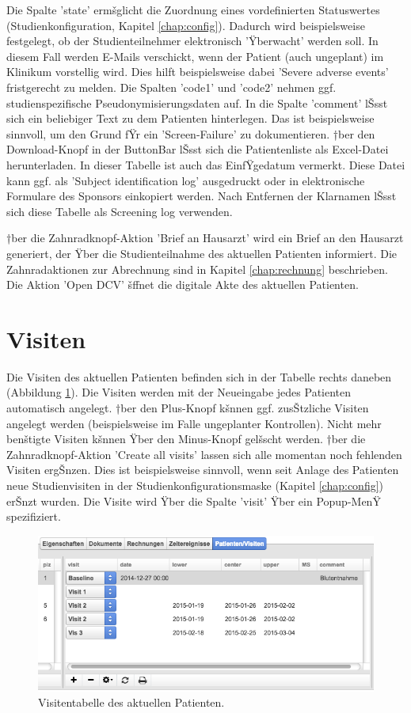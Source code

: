 \documentclass[11pt,oneside]{scrbook}
\begin{document}
Die Spalte 'state' ermšglicht die Zuordnung eines vordefinierten Statuswertes (Studienkonfiguration, Kapitel \ref{chap:config}). Dadurch wird beispielsweise festgelegt, ob der Studienteilnehmer elektronisch 'Ÿberwacht' werden soll. In diesem Fall werden  E-Mails verschickt, wenn der Patient (auch ungeplant) im Klinikum vorstellig wird. Dies hilft beispielsweise dabei 'Severe adverse events'  fristgerecht zu melden. Die Spalten 'code1' und 'code2' nehmen ggf. studienspezifische Pseudonymisierungsdaten auf. In die Spalte 'comment' lŠsst sich ein beliebiger Text zu dem Patienten hinterlegen. Das ist beispielsweise sinnvoll, um den Grund fŸr ein 'Screen-Failure' zu dokumentieren. †ber den Download-Knopf in der ButtonBar lŠsst sich die Patientenliste als Excel-Datei herunterladen. In dieser Tabelle ist auch das EinfŸgedatum vermerkt. Diese Datei kann ggf. als 'Subject identification log' ausgedruckt oder in elektronische Formulare des Sponsors einkopiert werden. Nach Entfernen der Klarnamen lŠsst sich diese Tabelle  als Screening log verwenden.

†ber die Zahnradknopf-Aktion 'Brief an Hausarzt' wird ein Brief an den Hausarzt generiert, der Ÿber die Studienteilnahme des aktuellen Patienten informiert. Die  Zahnradaktionen zur Abrechnung sind in Kapitel \ref{chap:rechnung} beschrieben. Die Aktion 'Open DCV' šffnet die digitale Akte des aktuellen Patienten.

\section{Visiten}
Die Visiten des aktuellen Patienten befinden sich in der Tabelle rechts daneben (Abbildung \ref{fig:visits}). Die Visiten werden mit der Neueingabe jedes Patienten automatisch angelegt. †ber den Plus-Knopf kšnnen ggf. zusŠtzliche Visiten angelegt werden (beispielsweise im Falle ungeplanter Kontrollen). Nicht mehr benštigte Visiten kšnnen Ÿber den Minus-Knopf gelšscht werden. †ber die Zahnradknopf-Aktion 'Create all visits' lassen sich  alle momentan noch fehlenden Visiten ergŠnzen. Dies ist beispielsweise sinnvoll, wenn seit Anlage des Patienten neue Studienvisiten in der Studienkonfigurationsmaske (Kapitel  \ref{chap:config}) erŠnzt wurden. Die Visite wird Ÿber die Spalte 'visit' Ÿber ein Popup-MenŸ spezifiziert.

\begin{figure}[htbp]
\begin{center}
\includegraphics[scale=0.63]{figs/visits.png}
\caption{Visitentabelle des aktuellen Patienten.}
\label{fig:visits}
\end{center}
\end{figure}
\end{document}

